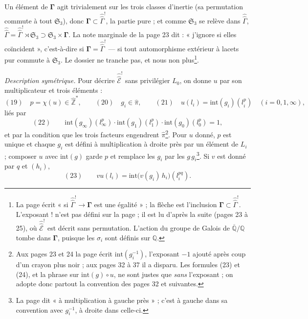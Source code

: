 \documentclass[11pt,a4paper]{article}
\begin{document}
Un élément de $\boldsymbol{\Gamma}$ agit trivialement sur les trois classes
d'inertie (sa permutation commute à tout $\mathfrak{S}_3$), donc
$\boldsymbol{\Gamma} \subset \hat{\hat\Gamma}^{!}$, la partie pure ; et comme
$\mathfrak{S}_3$ se relève dans $\hat{\hat\Gamma}$, $\hat{\hat\Gamma} =
\hat{\hat\Gamma}^{!} \rtimes \mathfrak{S}_3 \supset \mathfrak{S}_3 \times
\boldsymbol{\Gamma}$. La note marginale de la page 23 dit : « j'ignore si
elles coïncident », c'est-à-dire si $\boldsymbol{\Gamma} =
\hat{\hat\Gamma}^{!}$ — si tout automorphisme extérieur à lacets pur commute à
$\mathfrak{S}_3$. Le dossier ne tranche pas, et nous non plus\footnote{La page
écrit « si $\hat{\hat\Gamma}^{!} \to \boldsymbol{\Gamma}$ est une égalité » ;
la flèche est l'inclusion $\boldsymbol{\Gamma} \subset \hat{\hat\Gamma}^{!}$.
L'exposant $!$ n'est pas défini sur la page ; il est lu d'après la suite
(pages 23 à 25), où $\hat{\hat{\mathcal{E}}}^{!}$ est décrit sans permutation.
L'action du groupe de Galois de $\overline{\mathbb{Q}}/\mathbb{Q}$ tombe dans
$\boldsymbol{\Gamma}$, puisque les $\sigma_i$ sont définis sur $\mathbb{Q}$.}.

\emph{Description symétrique.} Pour décrire $\hat{\hat{\mathcal{E}}}^{!}$ sans
privilégier $L_0$, on donne $u$ par son multiplicateur et trois éléments :
\[
(19)\quad p = \chi(u) \in \widehat{\mathbb{Z}}^{*}, \qquad
(20)\quad g_i \in \widehat{\pi}, \qquad
(21)\quad u(l_i) = \mathrm{int}(g_i)(l_i^{p}) \quad (i = 0, 1, \infty),
\]
liés par
\[
(22)\qquad \mathrm{int}(g_\infty)(l_\infty^{p})\cdot
\mathrm{int}(g_1)(l_1^{p})\cdot \mathrm{int}(g_0)(l_0^{p}) = 1,
\]
et par la condition que les trois facteurs engendrent
$\widehat{\pi}$\footnote{Aux pages 23 et 24 la page écrit
$\mathrm{int}(g_i^{-1})$, l'exposant $-1$ ajouté après coup d'un crayon plus
noir ; aux pages 32 à 37 il a disparu. Les formules (23) et (24), et la phrase
sur $\mathrm{int}(g)\circ u$, ne sont justes que \emph{sans} l'exposant ; on
adopte donc partout la convention des pages 32 et suivantes.}. Pour $u$ donné,
$p$ est unique et chaque $g_i$ est défini à multiplication à droite près par
un élément de $L_i$ ; composer $u$ avec $\mathrm{int}(g)$ garde $p$ et remplace
les $g_i$ par les $g\,g_i$\footnote{La page dit « à multiplication à gauche
près » ; c'est à gauche dans sa convention avec $g_i^{-1}$, à droite dans
celle-ci.}. Si $v$ est donné par $q$ et $(h_i)$,
\[
(23)\qquad vu(l_i) = \mathrm{int}\bigl(v(g_i)\, h_i\bigr)(l_i^{pq}).
\]
\end{document}
